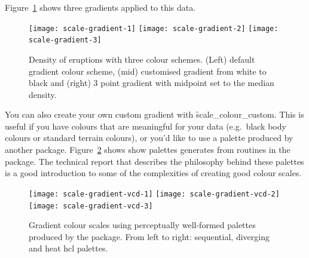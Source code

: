 Figure~\ref{fig:gradient} shows three gradients applied to this data.


\begin{figure}[htbp]
  \centering
    \texttt{[image: scale-gradient-1]}%
    \texttt{[image: scale-gradient-2]}%
    \texttt{[image: scale-gradient-3]}
  \caption{Density of eruptions with three colour schemes.  (Left) default gradient colour scheme, (mid) customised gradient from white to black and (right) 3 point gradient with midpoint set to the median density.}
  \label{fig:gradient}
\end{figure}


You can also create your own custom gradient with \f{scale_colour_custom}.  This is useful if you have colours that are meaningful for your data (e.g.\ black body colours or standard terrain colours), or you'd like to use a palette produced by another package.  Figure~\ref{fig:vcd} shows show palettes generates from routines in the  package.  The technical report \citet{zeileis:2007} that describes the philosophy behind these palettes is a good introduction to some of the complexities of creating good colour scales.


\begin{figure}[htbp]
  \centering
    \texttt{[image: scale-gradient-vcd-1]}%
    \texttt{[image: scale-gradient-vcd-2]}%
    \texttt{[image: scale-gradient-vcd-3]}
  \caption{Gradient colour scales using perceptually well-formed palettes produced by the  package.  From left to right: sequential, diverging and heat hcl palettes.}
  \label{fig:vcd}
\end{figure}


